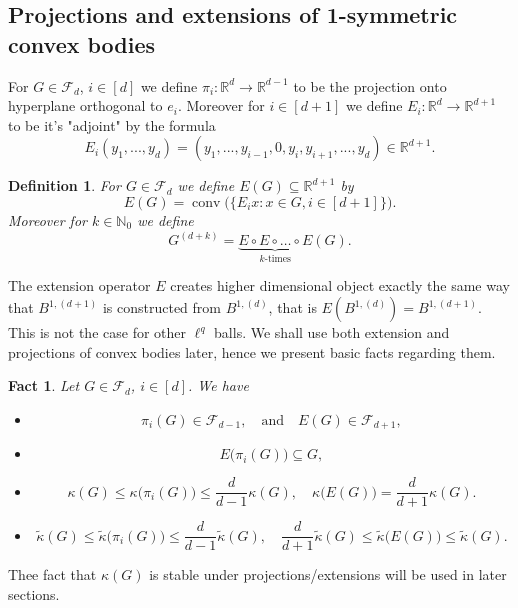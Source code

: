 \documentclass[10pt,a4paper]{amsart}
\numberwithin{equation}{section}
\newtheorem{Defn}[Thm]{Definition}
\newtheorem{Fact}[Thm]{Fact}
\newcommand{\R}{\mathbb{R}}
\newcommand{\N}{\mathbb{N}}
\DeclareMathOperator{\conv}{conv}
\begin{document}
\subsection{Projections and extensions of 1-symmetric convex bodies}
For $G \in \mathcal{F}_d$, $i \in [d]$ we define $\pi_i: \R^d \to \R^{d-1}$ to be the projection onto hyperplane orthogonal to $e_i$. Moreover for $i \in [d+1]$ we define $E_i: \R^{d} \to \R^{d+1}$ to be it's "adjoint" by the formula
\[
E_i(y_1,...,y_{d})=(y_1,...,y_{i-1},0,y_i,y_{i+1},...,y_{d}) \in \R^{d+1}.
\]
\begin{Defn}
For $G \in \mathcal{F}_d$ we define $E(G) \subseteq \R^{d+1}$ by
\[
E(G)= \conv\Big( \Big\lbrace E_ix : x \in G, i \in [d+1] \Big\} \Big).
\]
Moreover for $k \in \N_0$ we define 
\[
G^{(d+k)}=\underbrace{E \circ E \circ \ldots \circ E}_{k\text{-times}} (G).
\]
\end{Defn}
The extension operator $E$ creates higher dimensional object exactly the same way that $B^{1,(d+1)}$ is constructed from $B^{1,(d)}$, that is $E(B^{1,(d)})=B^{1,(d+1)}$. This is not the case for other $\ell^q$ balls. We shall use both extension and projections of convex bodies later, hence we present basic facts regarding them.
\begin{Fact} \label{fact about proj and ext}
 Let $G \in \mathcal{F}_d$, $i \in [d]$. We have
 \begin{itemize}
     \item 
     \[
     \pi_i(G) \in \mathcal{F}_{d-1}, \quad \text{and} \quad E(G) \in \mathcal{F}_{d+1},
     \]
     \item 
     \[
     E\big(\pi_i(G) \big) \subseteq G,
     \]
     \item 
     \[
     \kappa(G) \le \kappa\big(\pi_i(G)\big) \le \frac{d}{d-1} \kappa(G), \quad \kappa\big(E(G)\big)= \frac{d}{d+1} \kappa(G).
     \]
     \item \[
     \widetilde{\kappa}(G) \le \widetilde{\kappa}\big(\pi_i(G)\big) \le \frac{d}{d-1} \widetilde{\kappa}(G), \quad  \frac{d}{d+1} \widetilde{\kappa}(G) \le \widetilde{\kappa}\big(E(G)\big) \le \widetilde{\kappa}(G).
     \]
 \end{itemize}
\end{Fact}
Thee fact that $\kappa(G)$ is stable under projections/extensions will be used in later sections.
\end{document}
